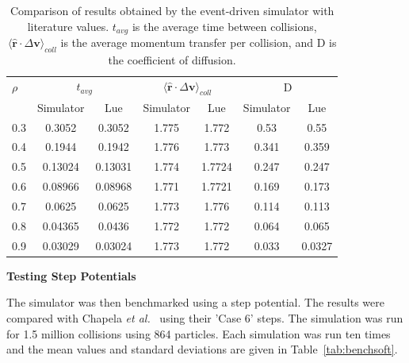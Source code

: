 \documentclass[12pt]{UoAthesis} \usepackage{booktabs}
\begin{document}
\begin{table} [htp]
  \caption [Event-driven simulation hard sphere benchmarking results]
  {Comparison of results obtained by the
    event-driven simulator with literature values. $t_{avg}$ is the
    average time between collisions, $\langle\mathbf{\hat{r}} \cdot
    \Delta \mathbf{v} \rangle_{coll}$ is the average momentum
    transfer per collision, and D is the coefficient of diffusion.}
  \label{tab:benchhard} 
  \begin{center} 
    \begin{tabular}{l c c c c c c} 
      \toprule $\rho$ & \multicolumn{2}{c}{$t_{avg}$} &
      \multicolumn{2}{c}{$\langle\mathbf{\hat{r}} \cdot \Delta
        \mathbf{v} \rangle_{coll}$} & \multicolumn{2}{c}{D} \\ 
      \cmidrule(rl{0.75em}){2-3} 
      \cmidrule(rl{0.75em}){4-5}
      \cmidrule(rl{0.75em}){6-7} & Simulator & Lue & Simulator & Lue &
      Simulator & Lue
      \\ \midrule 0.3 & 0.3052 & 0.3052 & 1.775 & 1.772 & 0.53 & 0.55 
      \\ 0.4 & 0.1944 & 0.1942 & 1.776 & 1.773 & 0.341 & 0.359 
      \\ 0.5 & 0.13024 & 0.13031 & 1.774 & 1.7724 & 0.247 & 0.247 
      \\ 0.6 & 0.08966 & 0.08968 & 1.771 & 1.7721 & 0.169 & 0.173 
      \\ 0.7 & 0.0625 & 0.0625 & 1.773 & 1.776 & 0.114 & 0.113
      \\ 0.8 & 0.04365 & 0.0436 & 1.772 & 1.772 & 0.064 & 0.065 
      \\ 0.9 & 0.03029 & 0.03024 & 1.773 & 1.772 & 0.033 & 0.0327
      \\ \bottomrule
    \end{tabular} 
  \end{center} 
\end{table}
\begin{flushleft}
\textbf{Testing Step Potentials}
\end{flushleft}
The simulator was then benchmarked using a step potential. The results
were compared with Chapela \textit{et al.}~\cite{Chapela1989} using their 'Case
6' steps. The simulation was run for 1.5 million collisions using 864
particles. Each simulation was run ten times and the mean values and
standard deviations are given in Table~\ref{tab:benchsoft}.
\end{document}
